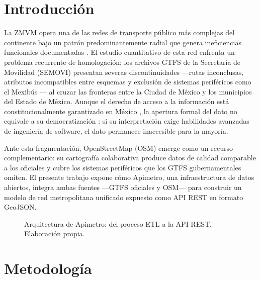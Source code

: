 \documentclass{isprs} %
\begin{document}
\maketitle
\sloppy

\section{Introducción}
\label{introduccion}

La ZMVM opera una de las redes de transporte público más complejas del continente
bajo un patrón predominantemente radial que genera ineficiencias funcionales
documentadas \citep{padilla2022expansion, molinero2002}.  El estudio cuantitativo
de esta red enfrenta un problema recurrente de homologación: los archivos GTFS de
la Secretaría de Movilidad (SEMOVI) presentan severas discontinuidades ---rutas
inconclusas, atributos incompatibles entre esquemas y exclusión de sistemas
periféricos como el Mexibús \citep{semovi2020diagnostico}--- al cruzar las fronteras
entre la Ciudad de México y los municipios del Estado de México.  Aunque el derecho
de acceso a la información está constitucionalmente garantizado en México
\citep{cpeum_art6}, la apertura formal del dato no equivale a su democratización
\citep{gurstein2011open}: si su interpretación exige habilidades avanzadas de
ingeniería de software, el dato permanece inaccesible para la mayoría.

Ante esta fragmentación, OpenStreetMap (OSM) emerge como un recurso complementario:
su cartografía colaborativa produce datos de calidad comparable a los oficiales
\citep{haklay2010good, barrington2017world} y cubre los sistemas periféricos que los
GTFS gubernamentales omiten.  El presente trabajo expone cómo Apimetro, una
infraestructura de datos abiertos, integra ambas fuentes ---GTFS oficiales y
OSM--- para construir un modelo de red metropolitana unificado expuesto como API
REST en formato GeoJSON.


\begin{figure}[t]
  \centering
  \resizebox{\textwidth}{!}{}
  \caption{Arquitectura de Apimetro: del proceso ETL a la API REST. Elaboración propia.}
  \label{fig:arquitectura}
\end{figure}

\section{Metodología}\label{sec:Metodologia}
\end{document}
